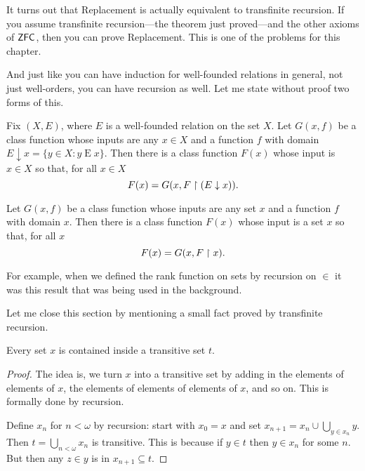 \documentclass[10pt]{amsart}
\begin{document}
It turns out that Replacement is actually equivalent to transfinite recursion. If you assume transfinite recursion---the theorem just proved---and the other axioms of $\mathsf{ZFC}$, then you can prove Replacement. This is one of the problems for this chapter.

And just like you can have induction for well-founded relations in general, not just well-orders, you can have recursion as well. Let me state without proof two forms of this.

\begin{theorem}
Fix $(X,E)$, where $E$ is a well-founded relation on the set $X$. Let $G(x,f)$ be a class function whose inputs are any $x \in X$ and a function $f$ with domain $E \downarrow x = \{ y \in X : y \mathbin E x\}$. Then there is a class function $F(x)$ whose input is $x \in X$ so that, for all $x \in X$
\[
F(x) = G(x, F \upharpoonright (E \downarrow x)).
\]

\end{theorem}

\begin{theorem}
Let $G(x,f)$ be a class function whose inputs are any set $x$ and a function $f$ with domain $x$. Then there is a class function $F(x)$ whose input is a set $x$ so that, for all $x$
\[
F(x) = G(x, F \upharpoonright x).
\]
\end{theorem}

For example, when we defined the rank function on sets by recursion on $\in$ it was this result that was being used in the background.
\smallskip

Let me close this section by mentioning a small fact proved by transfinite recursion.

\begin{lemma}
Every set $x$ is contained inside a transitive set $t$.
\end{lemma}

\begin{proof}
The idea is, we turn $x$ into a transitive set by adding in the elements of elements of $x$, the elements of elements of elements of $x$, and so on. This is formally done by recursion.

Define $x_n$ for $n < \omega$ by recursion: start with $x_0 = x$ and set $x_{n+1} = x_n \cup \bigcup_{y \in x_n} y$. Then $t = \bigcup_{n < \omega} x_n$ is transitive. This is because if $y \in t$ then $y \in x_n$ for some $n$. But then any $z \in y$ is in $x_{n+1} \subseteq t$.
\end{proof}
\end{document}

